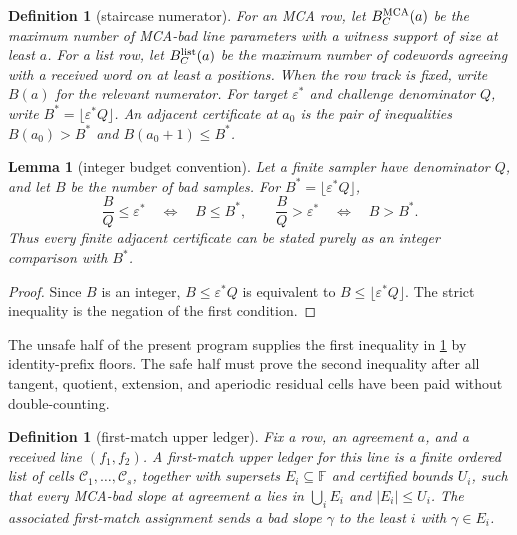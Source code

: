 \documentclass[a4paper,11pt]{amsart}
\newtheorem{lemma}[theorem]{Lemma}
\newtheorem{definition}[theorem]{Definition}
\theoremstyle{remark}
\newcommand{\F}{\mathbb F}
\begin{document}
\begin{definition}[staircase numerator]\label{def:staircase}
For an MCA row, let \(B_C^{\rm MCA}(a)\) be the maximum number of MCA-bad line parameters with a witness support of size at least \(a\).  For a list row, let \(B_C^{\rm list}(a)\) be the maximum number of codewords agreeing with a received word on at least \(a\) positions.  When the row track is fixed, write \(B(a)\) for the relevant numerator.  For target \(\varepsilon^*\) and challenge denominator \(Q\), write \(B^*=\lfloor \varepsilon^* Q\rfloor\).  An adjacent certificate at \(a_0\) is the pair of inequalities \(B(a_0)>B^*\) and \(B(a_0+1)\le B^*\).
\end{definition}

\begin{lemma}[integer budget convention]\label{lem:integer-budget}
Let a finite sampler have denominator \(Q\), and let \(B\) be the number of bad samples.  For \(B^*=\lfloor\varepsilon^*Q\rfloor\),
\[
        \frac{B}{Q}\le\varepsilon^*
        \quad\Longleftrightarrow\quad
        B\le B^*,
        \qquad
        \frac{B}{Q}>\varepsilon^*
        \quad\Longleftrightarrow\quad
        B>B^* .
\]
Thus every finite adjacent certificate can be stated purely as an integer comparison with \(B^*\).
\end{lemma}

\begin{proof}
Since \(B\) is an integer, \(B\le\varepsilon^*Q\) is equivalent to \(B\le\lfloor\varepsilon^*Q\rfloor\).  The strict inequality is the negation of the first condition.
\end{proof}

The unsafe half of the present program supplies the first inequality in \cref{def:staircase} by identity-prefix floors.  The safe half must prove the second inequality after all tangent, quotient, extension, and aperiodic residual cells have been paid without double-counting.

\begin{definition}[first-match upper ledger]\label{def:first-match-ledger}
Fix a row, an agreement \(a\), and a received line \((f_1,f_2)\).  A first-match upper ledger for this line is a finite ordered list of cells \(\mathcal C_1,\ldots,\mathcal C_s\), together with supersets \(E_i\subseteq\F\) and certified bounds \(U_i\), such that every MCA-bad slope at agreement \(a\) lies in \(\bigcup_i E_i\) and \(|E_i|\le U_i\).  The associated first-match assignment sends a bad slope \(\gamma\) to the least \(i\) with \(\gamma\in E_i\).
\end{definition}
\end{document}
